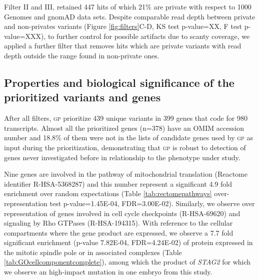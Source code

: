 \documentclass[fleqn,10pt]{wlscirep}
\newcommand{\gp}[]{\textsc{gp }}
\begin{document}
Filter II and III, retained 447 hits of which 21\% are private with respect to 1000 Genomes and gnomAD data sets. Despite comparable read depth between private and non-privates variants (Figure \ref{fig:filters}C-D, KS test p-value=XX, F test p-value=XXX), to further control for possible artifacts due to scanty coverage, we applied a further filter that removes hits which are private variants with read depth outside the range found in non-private ones.   




\subsection*{Properties and biological significance of the prioritized variants and genes} 

After all filters, \gp prioritize 439 unique variants in 399 genes that code for 980 transcripts. Almost all the prioritized genes (n=378) have an OMIM accession number and 18.8\% of them were not in the lists of candidate genes used by \gp as input during the prioritization, demonstrating that \gp is robust to detection of genes never investigated before in relationship to the phenotype under study. 

Nine genes are involved in the pathway of mitochondrial translation (Reactome identifier R-HSA-5368287) and this number represent a significant 4.9 fold enrichment over random expectations (Table \ref{tab:rectomepathways} over-representation test p-value=1.45E-04, FDR=3.00E-02). Similarly, we observe over representation of genes involved in cell cycle checkpoints (R-HSA-69620) and signaling by Rho GTPases (R-HSA-194315). With reference to the cellular compartments where the gene product are expressed, we observe a 7.7 fold significant enrichment (p-value 7.82E-04, FDR=4.24E-02) of protein expressed in the mitotic spindle pole or in associated complexes (Table \ref{tab:GOcellcomponentcomplete}), among which the product of \textit{STAG2} for which we observe an high-impact mutation in one embryo from this study.  
\end{document}
